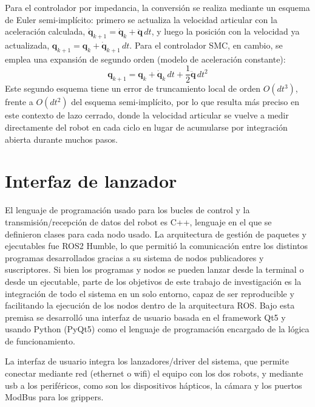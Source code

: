 Para el controlador por impedancia, la conversión se realiza mediante un
esquema de Euler semi-implícito: primero se actualiza la velocidad articular
con la aceleración calculada,
\(\boldsymbol{\dot{q}}_{k+1}=\boldsymbol{\dot{q}}_k+\boldsymbol{\ddot{q}}\,dt\),
y luego la posición con la velocidad ya actualizada,
\(\boldsymbol{q}_{k+1}=\boldsymbol{q}_k+\boldsymbol{\dot{q}}_{k+1}\,dt\). Para
el
controlador SMC, en cambio, se emplea una expansión de segundo orden (modelo
de aceleración constante):
\begin{equation}
	\boldsymbol{q}_{k+1} = \boldsymbol{q}_k + \boldsymbol{\dot{q}}_k \, dt +
	\frac{1}{2}\boldsymbol{\ddot{q}} \, dt^2
\end{equation}
Este segundo esquema tiene un error de truncamiento local de orden
\(O(dt^3)\), frente a \(O(dt^2)\) del esquema semi-implícito, por lo que
resulta
más preciso en este contexto de lazo cerrado, donde la velocidad articular se
vuelve a medir directamente del robot en cada ciclo en lugar de acumularse
por integración abierta durante muchos pasos.

\section{Interfaz de lanzador}
\label{sec:interfaz_lanzador}

El lenguaje de programación usado para los bucles de control y la
transmisión/recepción de datos del robot es C++, lenguaje en el que se
definieron clases para cada nodo usado. La arquitectura de gestión de paquetes
y ejecutables fue ROS2 Humble, lo que permitió la comunicación entre los
distintos programas desarrollados gracias a su sistema de nodos publicadores y
suscriptores. Si bien los programas y nodos se pueden lanzar desde la terminal
o desde un ejecutable, parte de los objetivos de este trabajo de investigación
es la integración de todo el sistema en un solo entorno, capaz de ser
reproducible y facilitando la ejecución de los nodos dentro de la arquitectura
ROS. Bajo esta premisa se desarrolló una interfaz de usuario basada en el
framework Qt5 y usando Python (PyQt5) como el lenguaje de programación
encargado de la lógica de funcionamiento.

La interfaz de usuario integra los lanzadores/driver del sistema, que permite
conectar mediante red (ethernet o wifi) el equipo con los dos robots, y
mediante usb a los periféricos, como son los dispositivos hápticos, la cámara y
los puertos ModBus para los grippers.
